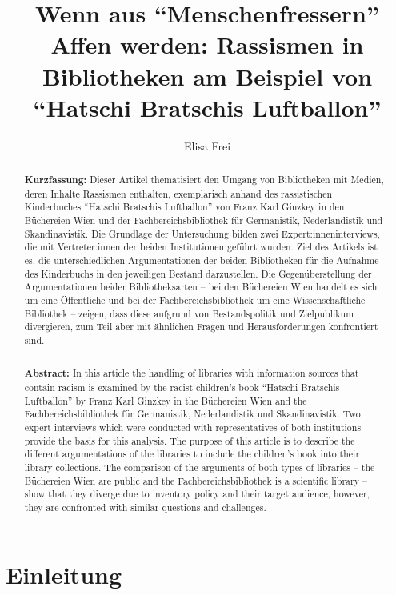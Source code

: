 \documentclass[a4paper,
fontsize=11pt,
oneside,
numbers=noperiodatend,
parskip=half-,
bibliography=totoc,
final
]{scrartcl}
\title{\LARGE{Wenn aus \enquote{Menschenfressern} Affen werden: Rassismen in Bibliotheken am Beispiel von \enquote{Hatschi Bratschis Luftballon}}}%
\author{Elisa Frei} %
\date{}
\begin{document}
\maketitle
\thispagestyle{fancyplain} 

\begin{abstract}
\noindent
\textbf{Kurzfassung:} Dieser Artikel thematisiert den Umgang von Bibliotheken mit
Medien, deren Inhalte Rassismen enthalten, exemplarisch anhand des
rassistischen Kinderbuches \enquote{Hatschi Bratschis Luftballon} von Franz
Karl Ginzkey in den Büchereien Wien und der Fachbereichsbibliothek für
Germanistik, Nederlandistik und Skandinavistik. Die Grundlage der
Untersuchung bilden zwei Expert:inneninterviews, die mit Vertreter:innen
der beiden Institutionen geführt wurden. Ziel des Artikels ist es, die
unterschiedlichen Argumentationen der beiden Bibliotheken für die
Aufnahme des Kinderbuchs in den jeweiligen Bestand darzustellen. Die
Gegenüberstellung der Argumentationen beider Bibliotheksarten -- bei den
Büchereien Wien handelt es sich um eine Öffentliche und bei der
Fachbereichsbibliothek um eine Wissenschaftliche Bibliothek -- zeigen,
dass diese aufgrund von Bestandspolitik und Zielpublikum divergieren,
zum Teil aber mit ähnlichen Fragen und Herausforderungen konfrontiert
sind.

\begin{center}\rule{0.5\linewidth}{0.5pt}\end{center}

\noindent \textbf{Abstract:} In this article the handling of libraries with information
sources that contain racism is examined by the racist children's book
\enquote{Hatschi Bratschis Luftballon} by Franz Karl Ginzkey in the Büchereien
Wien and the Fachbereichsbibliothek für Germanistik, Nederlandistik und
Skandinavistik. Two expert interviews which were conducted with
representatives of both institutions provide the basis for this
analysis. The purpose of this article is to describe the different
argumentations of the libraries to include the children's book into
their library collections. The comparison of the arguments of both types
of libraries -- the Büchereien Wien are public and the
Fachbereichsbibliothek is a scientific library -- show that they diverge
due to inventory policy and their target audience, however, they are
confronted with similar questions and challenges.
\end{abstract}

\hypertarget{einleitung}{%
\section{Einleitung}\label{einleitung}}
\end{document}
